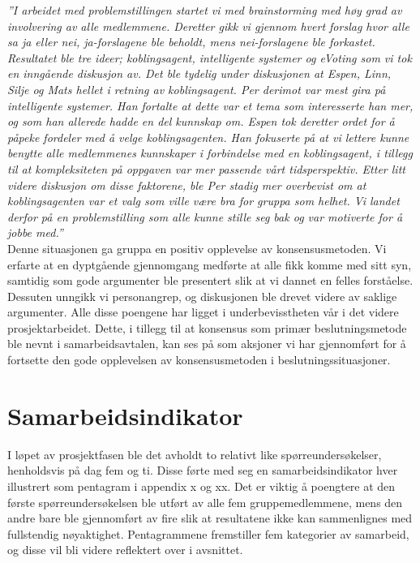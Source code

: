 \textit{''I arbeidet med problemstillingen startet vi med brainstorming med høy grad av involvering av alle medlemmene. Deretter gikk vi gjennom hvert forslag hvor alle sa ja eller nei, ja-forslagene ble beholdt, mens nei-forslagene ble forkastet. Resultatet ble tre ideer; koblingsagent, intelligente systemer og eVoting som vi tok en inngående diskusjon av. Det ble tydelig under diskusjonen at Espen, Linn, Silje og Mats hellet i retning av koblingsagent. Per derimot var mest gira på intelligente systemer. Han fortalte at dette var et tema som interesserte han mer, og som han allerede hadde en del kunnskap om. Espen tok deretter ordet for å påpeke fordeler med å velge koblingsagenten. Han fokuserte på at vi lettere kunne benytte alle medlemmenes kunnskaper i forbindelse med en koblingsagent, i tillegg til at kompleksiteten på oppgaven var mer passende vårt tidsperspektiv. Etter litt videre diskusjon om disse faktorene, ble Per stadig mer overbevist om at koblingsagenten var et valg som ville være bra for gruppa som helhet. Vi landet derfor på en problemstilling som alle kunne stille seg bak og var motiverte for å jobbe med.''}\\

Denne situasjonen ga gruppa en positiv opplevelse av konsensusmetoden. Vi erfarte at en dyptgående gjennomgang medførte at alle fikk komme med sitt syn, samtidig som gode argumenter ble presentert slik at vi dannet en felles forståelse. Dessuten unngikk vi personangrep, og diskusjonen ble drevet videre av saklige argumenter. Alle disse poengene har ligget i underbevisstheten vår i det videre prosjektarbeidet. Dette, i tillegg til at konsensus som primær beslutningsmetode ble nevnt i samarbeidsavtalen, kan ses på som aksjoner vi har gjennomført for å fortsette den gode opplevelsen av konsensusmetoden i beslutningssituasjoner.\\


\section{Samarbeidsindikator}
I løpet av prosjektfasen ble det avholdt to relativt like spørreundersøkelser, henholdsvis på dag fem og ti. Disse førte med seg en samarbeidsindikator hver illustrert som pentagram i appendix x og xx. Det er viktig å poengtere at den første spørreundersøkelsen ble utført av alle fem gruppemedlemmene, mens den andre bare ble gjennomført av fire slik at resultatene ikke kan sammenlignes med fullstendig nøyaktighet. Pentagrammene fremstiller fem kategorier av samarbeid, og disse vil bli videre reflektert over i avsnittet.\\

